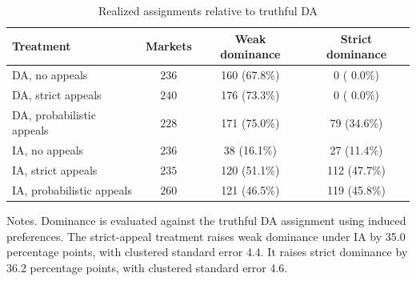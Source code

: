 \begin{table}[htbp]
\centering
\caption{Realized assignments relative to truthful DA}
\label{tab:pareto_rep}
\begin{tabular}{lccc}
\toprule
Treatment & Markets & Weak dominance & Strict dominance \\
\midrule
DA, no appeals &       \(236\) &       160 (67.8\%) &         0 ( 0.0\%) \\
DA, strict appeals &       \(240\) &       176 (73.3\%) &         0 ( 0.0\%) \\
DA, probabilistic appeals &       \(228\) &       171 (75.0\%) &        79 (34.6\%) \\
IA, no appeals &       \(236\) &        38 (16.1\%) &        27 (11.4\%) \\
IA, strict appeals &       \(235\) &       120 (51.1\%) &       112 (47.7\%) \\
IA, probabilistic appeals &       \(260\) &       121 (46.5\%) &       119 (45.8\%) \\
\bottomrule
\end{tabular}
\begin{flushleft}\footnotesize Notes. Dominance is evaluated against the truthful DA assignment using induced preferences. The strict-appeal treatment raises weak dominance under IA by 35.0 percentage points, with clustered standard error  4.4. It raises strict dominance by 36.2 percentage points, with clustered standard error  4.6.\end{flushleft}
\end{table}

